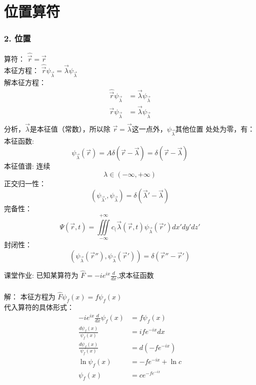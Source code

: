 \section{位置算符}
\begin{frame} [allowframebreaks=]
    \frametitle{2. 位置}
    算符：  $\hat{\vec r}=\vec{r}$ \\
    本征方程： $\hat{\vec r}\psi_{\vec \lambda}=\vec \lambda \psi_{\vec \lambda}$ \\
    解本征方程：
    \begin{equation*}
        \begin{split}
            \hat{\vec r}\psi_{\vec \lambda}&=\vec \lambda \psi_{\vec \lambda} \\
            \vec{r}\psi_{\vec \lambda}&=\vec \lambda \psi_{\vec \lambda} \\
        \end{split} 
    \end{equation*}
    分析，$\vec \lambda$是本征值（常数），所以除 $\vec r =\vec \lambda $这一点外，$\psi_{\vec \lambda}$其他位置
    处处为零，有：
    本征函数: $$ \psi_{\vec \lambda}(\vec{r})= A \delta(\vec{r}-\vec{\lambda})= \delta(\vec{r}-\vec{\lambda})$$
    本征值谱: 连续
        $$ \lambda \in (-\infty, +\infty) $$
    正交归一性：
        $$ (\psi_{\vec{\lambda}'}, \psi_{\vec{\lambda}}) =\delta(\vec{\lambda}'-\vec{\lambda})$$
    完备性：
    $$ \Psi(\vec{r},t)=\iiint\limits_{-\infty}^{+\infty}c_(\vec{\lambda}(\vec{r},t) \psi_{\vec{\lambda}}(\vec{r}') dx'dy'dz' $$
    封闭性：$$ (\psi_{\vec{\lambda}}(\vec{r}''), \psi_{\vec{\lambda}}(\vec{r}')) =\delta(\vec{r}''-\vec{r}')$$
\end{frame} 
\begin{frame} [allowframebreaks=]
    \begin{tcolorbox2}{课堂作业:}
        已知某算符为  $\hat{F}=-ie^{ix}\frac{d}{dx}$,求本征函数 \\  
     \end{tcolorbox2}
\end{frame} 

\begin{frame} [allowframebreaks=]
    \frametitle{}
    \alert{解：} 本征方程为 $\hat{F}\psi_f(x)=f\psi_f(x)$\\
    代入算符的具体形式：
    \begin{equation*}
        \begin{split}
            -ie^{ix}\frac{d}{dx}\psi_f(x)&=f\psi_f(x) \\
            \frac{d\psi_f(x)}{\psi_f(x)}&=ife^{-ix} dx \\
            \frac{d\psi_f(x)}{\psi_f(x)}&=d(-fe^{-ix}) \\
           \ln{\psi_f(x)}&=-fe^{-ix}+\ln c \\
           \psi_f(x)&=c e^{-fe^{-ix}}
        \end{split} 
    \end{equation*}
\end{frame} 

